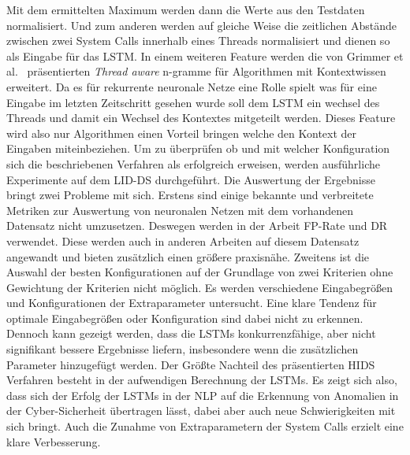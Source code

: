 Mit dem ermittelten Maximum werden dann die Werte aus den Testdaten normalisiert.
Und zum anderen werden auf gleiche Weise die zeitlichen Abstände zwischen zwei System Calls innerhalb eines Threads normalisiert und dienen so als Eingabe für das \ac{LSTM}.
In einem weiteren Feature werden die von Grimmer et al.~\cite{IDSTHREADGRIMMER2021} präsentierten \textit{Thread aware} n-gramme für Algorithmen mit Kontextwissen erweitert.
Da es für rekurrente neuronale Netze eine Rolle spielt was für eine Eingabe im letzten Zeitschritt gesehen wurde soll dem \ac{LSTM} ein wechsel des Threads und damit ein Wechsel des Kontextes mitgeteilt werden.
Dieses Feature wird also nur Algorithmen einen Vorteil bringen welche den Kontext der Eingaben miteinbeziehen.
Um zu überprüfen ob und mit welcher Konfiguration sich die beschriebenen Verfahren als erfolgreich erweisen, werden ausführliche Experimente auf dem \ac{LID-DS} durchgeführt.
Die Auswertung der Ergebnisse bringt zwei Probleme mit sich.
Erstens sind einige bekannte und verbreitete Metriken zur Auswertung von neuronalen Netzen mit dem vorhandenen Datensatz nicht umzusetzen.
Deswegen werden in der Arbeit \ac{FP}-Rate und \ac{DR} verwendet. 
Diese werden auch in anderen Arbeiten auf diesem Datensatz angewandt und bieten zusätzlich einen größere praxisnähe.
Zweitens ist die Auswahl der besten Konfigurationen auf der Grundlage von zwei Kriterien ohne Gewichtung der Kriterien nicht möglich.
Es werden verschiedene Eingabegrößen und Konfigurationen der Extraparameter untersucht.
Eine klare Tendenz für optimale Eingabegrößen oder Konfiguration sind dabei nicht zu erkennen.
Dennoch kann gezeigt werden, dass die \acp{LSTM} konkurrenzfähige, aber nicht signifikant bessere Ergebnisse liefern, insbesondere wenn die zusätzlichen Parameter hinzugefügt werden.
Der Größte Nachteil des präsentierten \ac{HIDS} Verfahren besteht in der aufwendigen Berechnung der \acp{LSTM}.
Es zeigt sich also, dass sich der Erfolg der \acp{LSTM} in der \ac{NLP} auf die Erkennung von Anomalien in der Cyber-Sicherheit übertragen lässt, dabei aber auch neue Schwierigkeiten mit sich bringt.
Auch die Zunahme von Extraparametern der System Calls erzielt eine klare Verbesserung.

